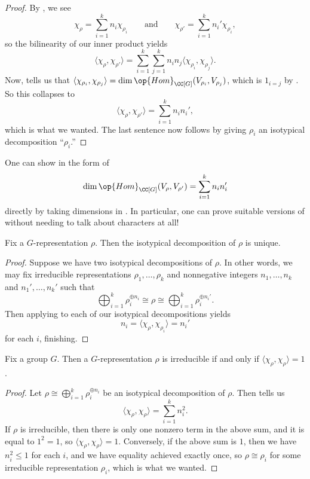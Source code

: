 \documentclass{article}
\begin{document}
\begin{proof}
	By , we see
	\[\chi_\rho=\sum_{i=1}^kn_i\chi_{\rho_i}\qquad\text{and}\qquad\chi_{\rho'}=\sum_{i=1}^kn_i'\chi_{\rho_i},\]
	so the bilinearity of our inner product yields
	\[\langle\chi_\rho,\chi_{\rho'}\rangle=\sum_{i=1}^k\sum_{j=1}^kn_in_j\langle\chi_{\rho_i},\chi_{\rho_j}\rangle.\]
	Now,  tells us that $\langle\chi_{\rho_i},\chi_{\rho_j}\rangle=\dim\op{Hom}_{\CC[G]}(V_{\rho_i},V_{\rho_j})$, which is $1_{i=j}$ by . So this collapses to
	\[\langle\chi_\rho,\chi_{\rho'}\rangle=\sum_{i=1}^kn_in_i',\]
	which is what we wanted. The last sentence now follows by giving $\rho_i$ an isotypical decomposition ``$\rho_i$.''
\end{proof}
\begin{remark}
	One can show  in the form of
	\[\dim\op{Hom}_{\CC[G]}(V_\rho,V_{\rho'})=\sum_{i=1}^kn_in_i'\]
	directly by taking dimensions in . In particular, one can prove suitable versions of  without needing to talk about characters at all!
\end{remark}
\begin{corollary} \label{cor:isotypical-unique}
	Fix a $G$-representation $\rho$. Then the isotypical decomposition of $\rho$ is unique.
\end{corollary}
\begin{proof}
	Suppose we have two isotypical decompositions of $\rho$. In other words, we may fix irreducible representations $\rho_1,\ldots,\rho_k$ and nonnegative integers $n_1,\ldots,n_k$ and $n_1',\ldots,n_k'$ such that
	\[\bigoplus_{i=1}^k\rho_i^{\oplus n_i}\cong\rho\cong\bigoplus_{i=1}^k\rho_i^{\oplus n_i'}.\]
	Then applying  to each of our isotypical decompositions yields
	\[n_i=\langle\chi_\rho,\chi_{\rho_i}\rangle=n_i'\]
	for each $i$, finishing.
\end{proof}
\begin{corollary} \label{cor:irrep-iff-norm-1}
	Fix a group $G$. Then a $G$-representation $\rho$ is irreducible if and only if $\langle\chi_\rho,\chi_\rho\rangle=1$.
\end{corollary}
\begin{proof}
	Let $\rho\cong\bigoplus_{i=1}^k\rho_i^{\oplus n_i}$ be an isotypical decomposition of $\rho$. Then  tells us
	\[\langle\chi_\rho,\chi_\rho\rangle=\sum_{i=1}^kn_i^2.\]
	If $\rho$ is irreducible, then there is only one nonzero term in the above sum, and it is equal to $1^2=1$, so $\langle\chi_\rho,\chi_\rho\rangle=1$. Conversely, if the above sum is $1$, then we have $n_i^2\le1$ for each $i$, and we have equality achieved exactly once, so $\rho\cong\rho_i$ for some irreducible representation $\rho_i$, which is what we wanted.
\end{proof}
\end{document}
